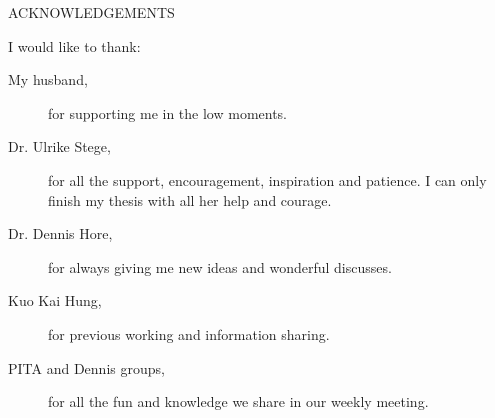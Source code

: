 \newpage
{}

\begin{center}
ACKNOWLEDGEMENTS
\end{center}

\noindent I would like to thank:
\begin{description}
\item[My husband,]
	for supporting me in the low moments.
\item[Dr. Ulrike Stege,]
	for  all the support, encouragement, inspiration and patience. I can only finish my thesis with all her help and courage.
\item[Dr. Dennis Hore,]
	for always giving me new ideas and wonderful discusses.
\item[Kuo Kai Hung, ]
	for previous working and information sharing.
\item[PITA and Dennis groups,]
	for all the fun and knowledge we share in our weekly meeting.
\end{description}

